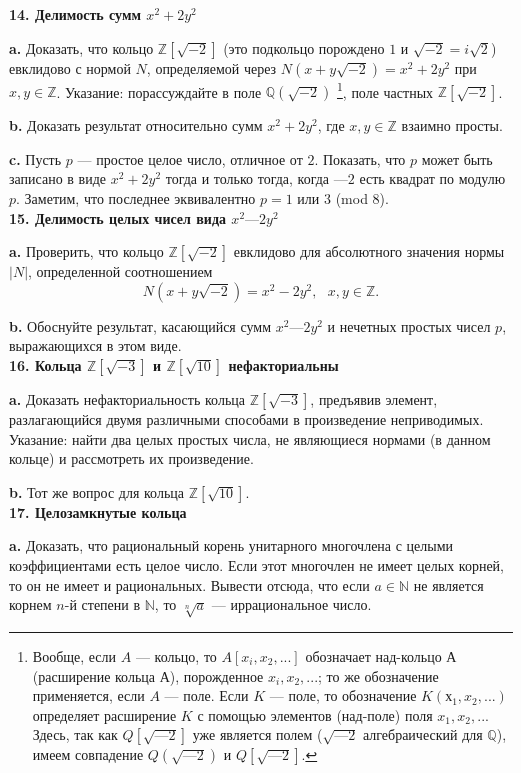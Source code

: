\documentclass{mai_book}
\begin{document}
\noindent \textbf{14. Делимость сумм $x^2+2 y^2$}

\textbf{a.} Доказать, что кольцо $\mathbb{Z}[\sqrt{-2}]$ (это подкольцо порождено $1$ и $\sqrt{-2}=i\sqrt{2}$) евклидово с нормой $N$, определяемой через $N(x+y\sqrt{-2}) = x^2+2y^2$ при $x,y \in \mathbb{Z}$. Указание: порассуждайте в поле $\mathbb{Q}(\sqrt{-2})$ \footnote{Вообще, если $A$ — кольцо, то $A[x_i,x_2,...]$ обозначает над-кольцо $А$ (расширение
кольца $А$), порожденное $x_i,x_2,...$; то же обозначение применяется, если $A$ — поле. Если $K$ — поле, то обозначение $K(х_1,x_2,...)$ определяет расширение $K$ с помощью элементов (над-поле) поля $x_1,x_2,...$ Здесь, так как $Q[\sqrt{—2}]$ уже является полем ($\sqrt{—2}$ алгебраический для $\mathbb{Q}$), имеем совпадение $Q(\sqrt{—2})$ и $Q[\sqrt{— 2}]$.}, поле частных $\mathbb{Z}[\sqrt{-2}]$.

\textbf{b.} Доказать результат относительно сумм $x^2 + 2 y^2$, где $x,y \in \mathbb{Z}$ взаимно просты.

\textbf{c.} Пусть $p$ — простое целое число, отличное от $2$. Показать, что
$p$ может быть записано в виде $x^2 + 2 y^2$ тогда и только тогда, когда
$—2$ есть квадрат по модулю $p$. Заметим, что последнее эквивалентно
$p = 1$ или $3$ (mod $8$).
\\

\noindent \textbf{15. Делимость целых чисел вида $x^2 — 2 y^2$}

\textbf{a.} Проверить, что кольцо $\mathbb{Z}[\sqrt{-2}]$ евклидово для абсолютного значения нормы $|N|$, определенной соотношением
\[
N(x+y\sqrt{-2})=x^2-2 y^2, \text{ } x,y \in \mathbb{Z}.
\]

\textbf{b.} Обоснуйте результат, касающийся сумм $x^2 — 2 y^2$ и нечетных
простых чисел $p$, выражающихся в этом виде.
\\

\noindent \textbf{16. Кольца $\mathbb{Z}[\sqrt{-3}]$ и $\mathbb{Z}[\sqrt{10}]$ нефакториальны}

\textbf{a.} Доказать нефакториальность кольца $\mathbb{Z}[\sqrt{-3}]$, предъявив элемент, разлагающийся двумя различными способами в произведение 
неприводимых. Указание: найти два целых простых числа, не являющиеся
нормами (в данном кольце) и рассмотреть их произведение.

\textbf{b.} Тот же вопрос для кольца $\mathbb{Z}[\sqrt{10}]$.
\\

\noindent \textbf{17. Целозамкнутые кольца}

\textbf{a.} Доказать, что рациональный корень унитарного многочлена с
целыми коэффициентами есть целое число. Если этот многочлен не
имеет целых корней, то он не имеет и рациональных. Вывести отсюда,
что если $a \in \mathbb{N}$ не является корнем $n$-й степени в $\mathbb{N}$, то $\sqrt[n]{a}$ — иррациональное число.
\end{document}
